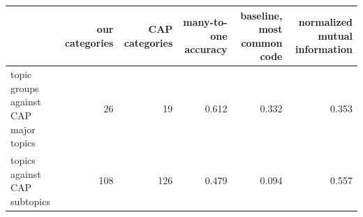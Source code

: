 \begin{tabular}{lrrrrr}
\toprule
 & our categories & CAP categories & many-to-one accuracy & baseline, most common code & normalized mutual information \\
\midrule
topic groups against CAP major topics & 26 & 19 & 0.612 & 0.332 & 0.353 \\
topics against CAP subtopics & 108 & 126 & 0.479 & 0.094 & 0.557 \\
\bottomrule
\end{tabular}
